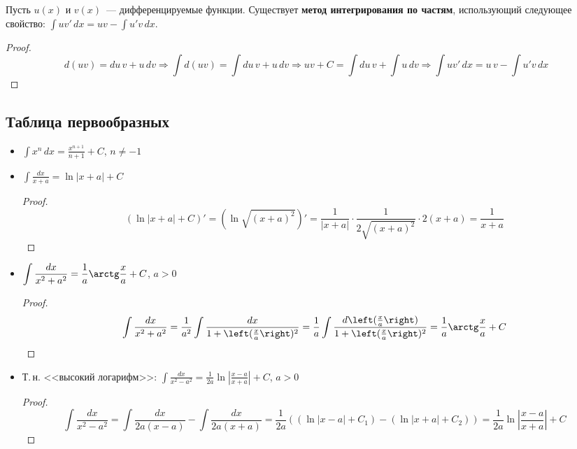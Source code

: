 Пусть $u(x)$ и $v(x)$~--- дифференцируемые функции.
Существует \textbf{метод интегрирования по частям}, использующий следующее свойство:
$\int uv'\,dx = uv - \int u'v\,dx$.
\begin{proof}
\begin{equation*}
d(uv) = du\,v + u\,dv \Rightarrow
\int d(uv) = \int du\,v + u\,dv \Rightarrow
uv + C = \int du\,v + \int u\,dv \Rightarrow
\int uv'\,dx = u\,v - \int u'v\,dx
\end{equation*}
\end{proof}

\subsection{Таблица первообразных}
\begin{itemize}
	\item $\displaystyle \int x^n\,dx = \frac{x^{n+1}}{n + 1} + C$, $n \neq -1$
	
	\item $\displaystyle \int \frac{dx}{x + a} = \ln |x + a| + C$
	\begin{proof}
	\begin{equation*}
	(\ln |x + a| + C)' = (\ln \sqrt{(x + a)^2})' = \frac1{|x + a|} \cdot \frac1{2\sqrt{(x + a)^2}} \cdot 2(x + a) = \frac1{x + a}
	\end{equation*}
	\end{proof}
	
	\item $\displaystyle \int \frac{dx}{x^2 + a^2} = \frac1a \arctg \frac{x}a + C$, $a > 0$
	\begin{proof}
	\begin{equation*}
	\int \frac{dx}{x^2 + a^2} =
	\frac1{a^2} \int \frac{dx}{1 + \left( \frac{x}a \right)^2} =
	\frac1a \int \frac{d \left( \frac{x}a \right)}{1 + \left( \frac{x}a \right)^2} =
	\frac1a \arctg \frac{x}a + C
	\end{equation*}
	\end{proof}
	
	\item Т.\,н. <<высокий логарифм>>: $\displaystyle \int \frac{dx}{x^2 - a^2} = \frac1{2a} \ln \left| \frac{x - a}{x + a} \right| + C$, $a > 0$
	\begin{proof}
	\begin{equation*}
	\int \frac{dx}{x^2 - a^2} =
	\int \frac{dx}{2a(x - a)} - \int \frac{dx}{2a(x + a)} =
	\frac1{2a} ((\ln |x - a| + C_1) - (\ln |x + a| + C_2)) =
	\frac1{2a} \ln \left| \frac{x - a}{x + a} \right| + C
	\end{equation*}
	\end{proof}
	

\end{itemize}
